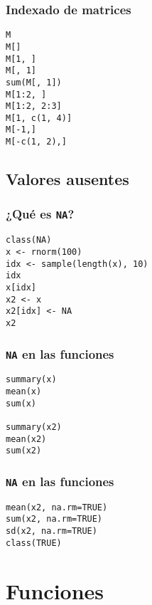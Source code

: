 \documentclass{beamer}
\begin{document}
\begin{frame}[fragile]
\frametitle{Indexado de matrices}
\label{sec-1-2-7}


\lstset{language=R}
\begin{lstlisting}
M
M[]
M[1, ]
M[, 1]
sum(M[, 1])
M[1:2, ]
M[1:2, 2:3]
M[1, c(1, 4)]
M[-1,]
M[-c(1, 2),]
\end{lstlisting}
    
\end{frame}
\subsection{Valores ausentes}
\label{sec-1-3}

   
\begin{frame}[fragile]
\frametitle{¿Qué es \texttt{NA}?}
\label{sec-1-3-1}


\lstset{language=R}
\begin{lstlisting}
class(NA)
x <- rnorm(100)
idx <- sample(length(x), 10)
idx
x[idx]
x2 <- x
x2[idx] <- NA
x2
\end{lstlisting}
\end{frame}
\begin{frame}[fragile]
\frametitle{\texttt{NA} en las funciones}
\label{sec-1-3-2}



\lstset{language=R}
\begin{lstlisting}
summary(x)
mean(x)
sum(x)

summary(x2)
mean(x2)
sum(x2)
\end{lstlisting}
\end{frame}
\begin{frame}[fragile]
\frametitle{\texttt{NA} en las funciones}
\label{sec-1-3-3}



\lstset{language=R}
\begin{lstlisting}
mean(x2, na.rm=TRUE)
sum(x2, na.rm=TRUE)
sd(x2, na.rm=TRUE)
class(TRUE)
\end{lstlisting}
\end{frame}
\section{Funciones}
\label{sec-2}
\end{document}
